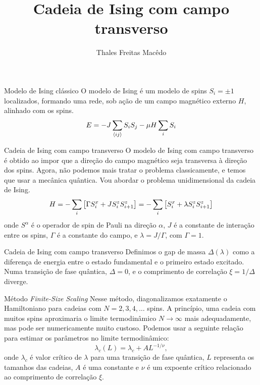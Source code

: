 \documentclass[brazil]{beamer}
\title{Cadeia de Ising com campo transverso}
\author{Thales Freitas Macêdo}
\begin{document}
\frame{\titlepage}

\begin{frame}{Modelo de Ising clássico}
    O modelo de Ising é um modelo de spins \( S_i = \pm 1 \) localizados, formando uma rede, sob ação de um campo magnético externo \( H \), alinhado com os spins.
    \[ E = - J \sum_{\expval{ij}} S_i S_j - \mu H \sum_i S_i \]
\end{frame}

\begin{frame}{Cadeia de Ising com campo transverso}
    O modelo de Ising com campo transverso é obtido ao impor que a direção do campo magnético seja transversa à direção dos spins.
    Agora, não podemos mais tratar o problema classicamente, e temos que usar a mecânica quântica.
    Vou abordar o problema unidimensional da cadeia de Ising.
    \begin{equation}
        H = - \sum_i \qty[\Gamma S_i^x + J S_i^z S_{i + 1}^z] = - \sum_i \qty[S_i^x + \lambda S_i^z S_{i + 1}^z] \label{hamiltoniano}
    \end{equation}
    onde \( S^\alpha \) é o operador de spin de Pauli na direção \( \alpha \), \( J \) é a constante de interação entre os spins, \( \Gamma \) é a constante do campo, e \( \lambda = J / \Gamma \), com \( \Gamma = 1 \).
\end{frame}

\begin{frame}{Cadeia de Ising com campo transverso}
    Definimos o gap de massa \( \Delta (\lambda) \) como a diferença de energia entre o estado fundamental e o primeiro estado excitado.
    Numa transição de fase quântica, \( \Delta = 0 \), e o comprimento de correlação \( \xi = 1 / \Delta \) diverge.
\end{frame}

\begin{frame}{Método \textit{Finite-Size Scaling}}
    Nesse método, diagonalizamos exatamente o Hamiltoniano para cadeias com \( N = 2, 3, 4, \dots \) spins.
    A princípio, uma cadeia com muitos spins aproximaria o limite termodinâmico \( N \to \infty \) mais adequadamente, mas pode ser numericamente muito custoso.
    Podemos usar a seguinte relação para estimar os parâmetros no limite termodinâmico:
    \begin{equation}
        \lambda_c (L) = \lambda_c + A L^{-1/\nu} ,
    \end{equation}
    onde \( \lambda_c \) é valor crítico de \( \lambda \) para uma transição de fase quântica, \( L \) representa os tamanhos das cadeias, \( A \) é uma constante e \( \nu \) é um expoente crítico relacionado ao comprimento de correlação \( \xi \).
\end{frame}
\end{document}

